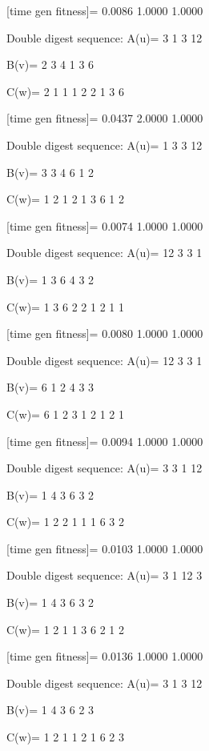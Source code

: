 [time gen fitness]=
    0.0086    1.0000    1.0000

Double digest sequence:
A(u)=
     3     1     3    12

B(v)=
     2     3     4     1     3     6

C(w)=
     2     1     1     1     2     2     1     3     6

[time gen fitness]=
    0.0437    2.0000    1.0000

Double digest sequence:
A(u)=
     1     3     3    12

B(v)=
     3     3     4     6     1     2

C(w)=
     1     2     1     2     1     3     6     1     2

[time gen fitness]=
    0.0074    1.0000    1.0000

Double digest sequence:
A(u)=
    12     3     3     1

B(v)=
     1     3     6     4     3     2

C(w)=
     1     3     6     2     2     1     2     1     1

[time gen fitness]=
    0.0080    1.0000    1.0000

Double digest sequence:
A(u)=
    12     3     3     1

B(v)=
     6     1     2     4     3     3

C(w)=
     6     1     2     3     1     2     1     2     1

[time gen fitness]=
    0.0094    1.0000    1.0000

Double digest sequence:
A(u)=
     3     3     1    12

B(v)=
     1     4     3     6     3     2

C(w)=
     1     2     2     1     1     1     6     3     2

[time gen fitness]=
    0.0103    1.0000    1.0000

Double digest sequence:
A(u)=
     3     1    12     3

B(v)=
     1     4     3     6     3     2

C(w)=
     1     2     1     1     3     6     2     1     2

[time gen fitness]=
    0.0136    1.0000    1.0000

Double digest sequence:
A(u)=
     3     1     3    12

B(v)=
     1     4     3     6     2     3

C(w)=
     1     2     1     1     2     1     6     2     3

